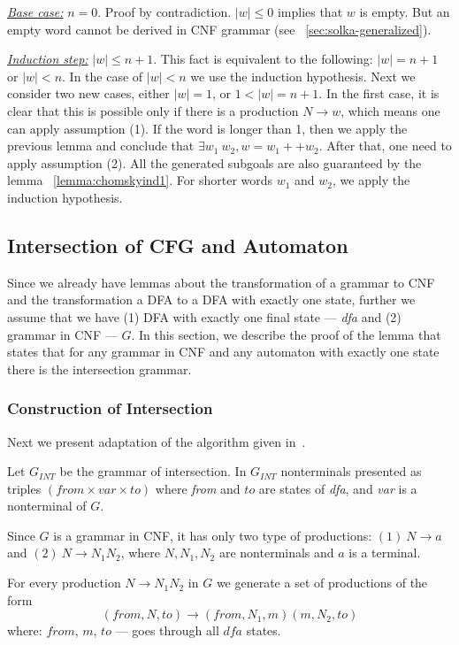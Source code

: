 \underline{\textit{Base case:}} $ n = 0 $. Proof by contradiction. $|w| \le 0$ implies that $w$ is empty. But an empty word cannot be derived in CNF grammar (see ~\ref{sec:solka-generalized}).


\underline{\textit{Induction step:}} $|w| \le n+1$. This fact is equivalent to the following:  $|w| = n+1$ or $|w| < n$. 
In the case of $|w| < n$ we use the induction hypothesis.
Next we consider two new cases, either $|w| = 1 $, or $1 < |w| = n + 1$.
In the first case, it is clear that this is possible only if there is a production $N \to w$, which means one can apply assumption (1).
If the word is longer than 1, then we apply the previous lemma and conclude that $\exists w_1 \ w_2, w = w_1 ++ w_2$. After that,
one need to apply assumption (2). All the generated subgoals are also guaranteed by the lemma ~\ref{lemma:chomskyind1}. 
For shorter words $w_1$ and $w_2$, we apply the induction hypothesis.

\subsection{Intersection of CFG and Automaton}

Since we already have lemmas about the transformation of a grammar to CNF and the transformation a DFA to a DFA with exactly one state, further we assume that we have (1) DFA with exactly one final state --- \textit{dfa} and (2) grammar in CNF --- $G$. In this section, we describe the proof of the lemma that states that for any grammar in CNF and any automaton with exactly one state there is the intersection grammar.

\subsubsection{Construction of Intersection}

Next we present adaptation of the algorithm given in~\cite{beigelproof}. 

Let $G_{INT}$ be the grammar of intersection. In $G_{INT}$ nonterminals presented as triples $(\textit{from} \times var \times to) $ where \textit{from} and $to$ are states of \textit{dfa}, and \textit{var} is a nonterminal of $G$.

Since $G$ is a grammar in CNF, it has only two type of productions: $(1)\ N \to a $ and $(2) \ N \to N_{1} N_{2}$, where $N, N_1, N_2$ are nonterminals and $a$ is a terminal.

For every production $N \to N_1 N_2$ in $G$ we generate a set of productions of the form $$(from, N, to) \to (from, N_1,  m) (m, N_2, to)$$ where: $from$, $m$, $to$ --- goes through all $\textit{dfa}$ states.

